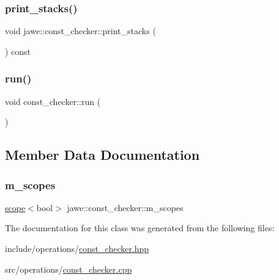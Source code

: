 \subsubsection{\texorpdfstring{print\+\_\+stacks()}{print\_stacks()}}
{\footnotesize\ttfamily void jawe\+::const\+\_\+checker\+::print\+\_\+stacks (\begin{DoxyParamCaption}{ }\end{DoxyParamCaption}) const\hspace{0.3cm}{\ttfamily [private]}}

\mbox{\label{classjawe_1_1const__checker_aa0c7604001ebd8aae5ddab7b52271b47}} 
\subsubsection{\texorpdfstring{run()}{run()}}
{\footnotesize\ttfamily void const\+\_\+checker\+::run (\begin{DoxyParamCaption}{ }\end{DoxyParamCaption})}



\subsection{Member Data Documentation}
\mbox{\label{classjawe_1_1const__checker_a61092ccd1994ec0075ca03ec39ea4477}} 
\subsubsection{\texorpdfstring{m\+\_\+scopes}{m\_scopes}}
{\footnotesize\ttfamily \hyperlink{classjawe_1_1utils_1_1scope}{scope}$<$bool$>$ jawe\+::const\+\_\+checker\+::m\+\_\+scopes\hspace{0.3cm}{\ttfamily [private]}}



The documentation for this class was generated from the following files\+:\begin{DoxyCompactItemize}
\item 
include/operations/\hyperlink{const__checker_8hpp}{const\+\_\+checker.\+hpp}\item 
src/operations/\hyperlink{const__checker_8cpp}{const\+\_\+checker.\+cpp}\end{DoxyCompactItemize}
